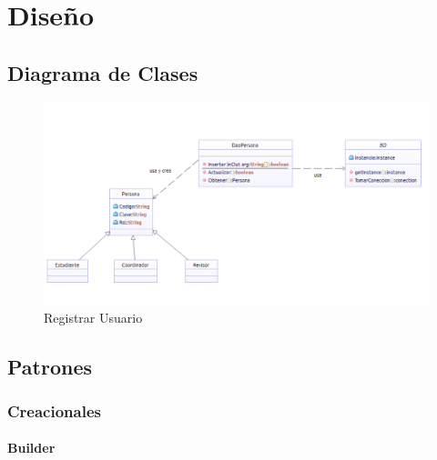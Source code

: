 \chapter{Diseño}





\section{Diagrama de Clases}

\begin{figure}[th!]
	\centering
	\includegraphics[width=1.2\linewidth]{uml/Clases/ClasesCrearUsuario}
	\caption{Registrar Usuario}
	\label{fig:Registrar Usuario}
\end{figure}

\newpage

\section{Patrones}

\subsection{Creacionales}

\bigskip

\subsubsection{Builder}

